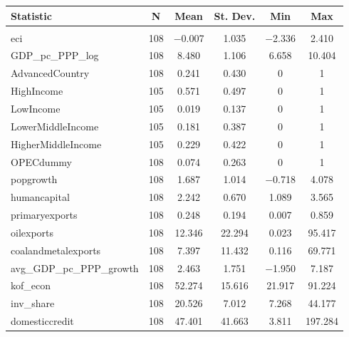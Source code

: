 
\begin{tabular}{@{\hspace{5pt}}lccccc} 
\toprule 
 
Statistic & \multicolumn{1}{c}{N} & \multicolumn{1}{c}{Mean} & \multicolumn{1}{c}{St. Dev.} & \multicolumn{1}{c}{Min} & \multicolumn{1}{c}{Max} \\ 
\midrule \\[-2.1ex] 
eci & 108 & $-$0.007 & 1.035 & $-$2.336 & 2.410 \\ 
GDP\_pc\_PPP\_log & 108 & 8.480 & 1.106 & 6.658 & 10.404 \\ 
AdvancedCountry & 108 & 0.241 & 0.430 & 0 & 1 \\ 
HighIncome & 105 & 0.571 & 0.497 & 0 & 1 \\ 
LowIncome & 105 & 0.019 & 0.137 & 0 & 1 \\ 
LowerMiddleIncome & 105 & 0.181 & 0.387 & 0 & 1 \\ 
HigherMiddleIncome & 105 & 0.229 & 0.422 & 0 & 1 \\ 
OPECdummy & 108 & 0.074 & 0.263 & 0 & 1 \\ 
popgrowth & 108 & 1.687 & 1.014 & $-$0.718 & 4.078 \\ 
humancapital & 108 & 2.242 & 0.670 & 1.089 & 3.565 \\ 
primaryexports & 108 & 0.248 & 0.194 & 0.007 & 0.859 \\ 
oilexports & 108 & 12.346 & 22.294 & 0.023 & 95.417 \\ 
coalandmetalexports & 108 & 7.397 & 11.432 & 0.116 & 69.771 \\ 
avg\_GDP\_pc\_PPP\_growth & 108 & 2.463 & 1.751 & $-$1.950 & 7.187 \\ 
kof\_econ & 108 & 52.274 & 15.616 & 21.917 & 91.224 \\ 
inv\_share & 108 & 20.526 & 7.012 & 7.268 & 44.177 \\ 
domesticcredit & 108 & 47.401 & 41.663 & 3.811 & 197.284 \\ 
\bottomrule 
\end{tabular} 
